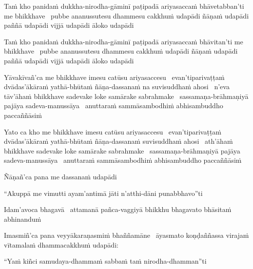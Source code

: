 \begin{pali-hang}
  Taṁ kho panidaṁ dukkha-nirodha-gāminī paṭipadā ariyasaccaṁ bhāvetabban'ti me bhikkhave \breathmark\ pubbe ananussutesu dhammesu cakkhuṁ udapādi ñāṇaṁ udapādi paññā udapādi vijjā udapādi āloko udapādi
\end{pali-hang}

\begin{pali-hang}
  Taṁ kho panidaṁ dukkha-nirodha-gāminī paṭipadā ariyasaccaṁ bhāvitan'ti me bhikkhave \breathmark\ pubbe ananussutesu dhammesu cakkhuṁ udapādi ñāṇaṁ udapādi paññā udapādi vijjā udapādi āloko udapādi
\end{pali-hang}

\begin{pali-hang}
  Yāvakīvañ'ca me bhikkhave imesu catūsu ariyasaccesu \breathmark\ evan'tiparivaṭṭaṁ dvādas'ākāraṁ yathā-bhūtaṁ ñāṇa-dassanaṁ na suvisuddhaṁ ahosi \breathmark\ n'eva tāv'āhaṁ bhikkhave sadevake loke samārake sabrahmake \breathmark\ sassamaṇa-brāhmaṇiyā pajāya sadeva-manussāya \breathmark\ anuttaraṁ sammāsambodhiṁ abhisambuddho paccaññāsiṁ
\end{pali-hang}

\begin{pali-hang}
  Yato ca kho me bhikkhave imesu catūsu ariyasaccesu \breathmark\ evan'tiparivaṭṭaṁ dvādas'ākāraṁ yathā-bhūtaṁ ñāṇa-dassanaṁ suvisuddhaṁ ahosi \breathmark\ ath'āhaṁ bhikkhave sadevake loke samārake sabrahmake \breathmark\ sassamaṇa-brāhmaṇiyā pajāya sadeva-manussāya \breathmark\ anuttaraṁ sammāsambodhiṁ abhisambuddho paccaññāsiṁ
\end{pali-hang}

Ñāṇañ'ca pana me dassanaṁ udapādi

\begin{pali-hang}
  ``Akuppā me vimutti ayam'antimā jāti n'atthi-dāni punabbhavo''ti
\end{pali-hang}

\begin{pali-hang}
  Idam'avoca bhagavā \breathmark\ attamanā pañca-vaggiyā bhikkhu bhagavato bhāsitaṁ abhinanduṁ
\end{pali-hang}

\begin{pali-hang}
  Imasmiñ'ca pana veyyākaraṇasmiṁ bhaññamāne \breathmark\ āyasmato koṇḍaññassa virajaṁ vītamalaṁ dhammacakkhuṁ udapādi:
\end{pali-hang}

``Yaṁ kiñci samudaya-dhammaṁ sabbaṁ taṁ nirodha-dhamman''ti

